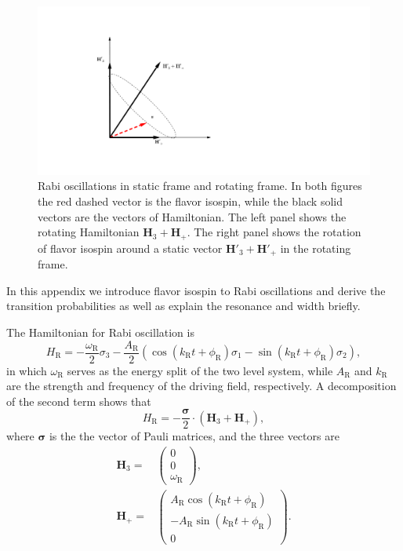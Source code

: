 \documentclass[%
reprint,
 amsmath,amssymb,
 aps,
]{revtex4-1}
\begin{document}
\begin{figure}
        \centering
        \includegraphics[width=\columnwidth, trim={20cm 10cm 50cm 10cm},clip]{assets/rabi-isospin-rotating-frame}
    \caption{Rabi oscillations in static frame and rotating frame. In both figures the red dashed vector is the flavor isospin, while the black solid vectors are the vectors of Hamiltonian. The left panel shows the rotating Hamiltonian $\mathbf{H}_3+\mathbf{H}_+$. The right panel shows the rotation of flavor isospin around a static vector $\mathbf{H}'_3+\mathbf{H}'_+$ in the rotating frame.}
    \label{fig-rabi-isospin-rotating-frame}
\end{figure}

In this appendix we introduce flavor isospin \cite{Duan2006a} to Rabi oscillations and derive the transition probabilities as well as explain the resonance and width briefly.


The Hamiltonian for Rabi oscillation is
\begin{equation}
    H_{\mathrm R} = -\frac{\omega_{\mathrm R}}{2}\sigma_3 - \frac{A_{\mathrm{R}} }{2}  \left( \cos(k_{\mathrm{R}} t +\phi_{\mathrm{R}})\sigma_1  - \sin(k_{\mathrm{R}} t +\phi_{\mathrm{R}}) \sigma_2\right),
    \label{rabi-oscillation-single-perturbation}
\end{equation}
in which $\omega_{\mathrm R}$ serves as the energy split of the two level system, while $A_{\mathrm{R}}$ and $k_{\mathrm{R}}$ are the strength and frequency of the driving field, respectively. A decomposition of the second term shows that
\begin{equation*}
H_{\mathrm R} 
= - \frac{\boldsymbol{\sigma}}{2} \cdot (\mathbf{H}_3 + \mathbf{H}_+ ) ,
\end{equation*}
where $\boldsymbol{\sigma}$ is the the vector of Pauli matrices, and the three vectors are
\begin{align}
    \mathbf{H}_3 = & \begin{pmatrix}
    0 \\ 0 \\ \omega_{\mathrm R}
    \end{pmatrix}, \\
    \mathbf{H}_+ = & \begin{pmatrix}
    A_{\mathrm{R}} \cos(k_{\mathrm{R}} t +\phi_{\mathrm{R}}) \\
    - A_{\mathrm{R}} \sin(k_{\mathrm{R}} t +\phi_{\mathrm{R}}) \\
    0
    \end{pmatrix}.
\end{align}
\end{document}
